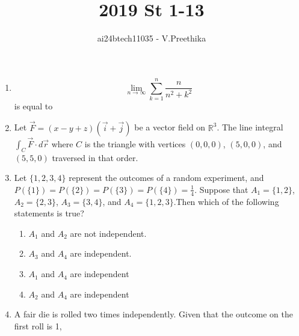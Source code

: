 \documentclass[journal]{IEEEtran}
\begin{document}

\vspace{3cm}

\title{2019 St 1-13}
\author{ai24btech11035 - V.Preethika}
\maketitle
\bigskip

\renewcommand{\thefigure}{\theenumi}
\renewcommand{\thetable}{\theenumi}
\begin{enumerate}
\item \[\lim_{n \to \infty} \sum_{k=1}^{n} \frac{n}{n^2 + k^2} \] is equal to
\begin{enumerate}
\end{enumerate}
\item Let $\vec{F} = (x - y + z)(\vec{i} + \vec{j})$ be a vector field on $\mathbb{R}^3$. The line integral $\int_C \vec{F} \cdot d\vec{r}$ where $C$ is the triangle with vertices $(0,0,0)$, $(5,0,0)$, and $(5,5,0)$ traversed in that order.
\begin{enumerate}
\end{enumerate}
\item Let $\{1,2,3,4\}$ represent the outcomes of a random experiment, and $P(\{1\}) = P(\{2\}) = P(\{3\}) = P(\{4\}) = \frac{1}{4}$. Suppose that $A_1 = \{1,2\}$, $A_2 = \{2,3\}$, $A_3 = \{3,4\}$, and $A_4 = \{1,2,3\}$.Then which of the following statements is true?
\begin{enumerate}
\item $A_1$ and $A_2$ are not independent.
\item $A_3$ and $A_4$ are independent.
\item $A_1$ and $A_4$ are independent
\item $A_2$ and $A_4$ are independent
\end{enumerate}
\item A fair die is rolled two times independently. Given that the outcome on the first roll is 1, 

\end{enumerate}
\end{document}
